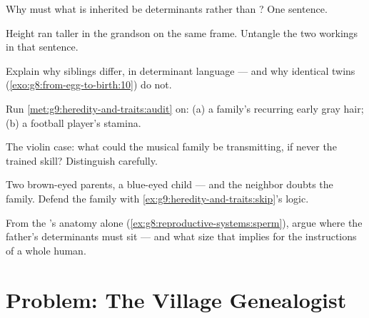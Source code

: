 \begin{exercise}[$\star$]\label{exo:g9:heredity-and-traits:6}
Why must what is inherited be determinants rather than
? One sentence.
\end{exercise}

\begin{exercise}[$\star\star$]\label{exo:g9:heredity-and-traits:7}
Height ran taller in the grandson on the same frame.
Untangle the two workings in that sentence.
\end{exercise}

\begin{exercise}[$\star\star$]\label{exo:g9:heredity-and-traits:8}
Explain why siblings differ, in determinant language ---
and why identical twins
(\cref{exo:g8:from-egg-to-birth:10}) do not.
\end{exercise}

\begin{exercise}[$\star\star$]\label{exo:g9:heredity-and-traits:9}
Run \cref{met:g9:heredity-and-traits:audit} on: (a) a
family's recurring early gray hair; (b) a football
player's stamina.
\end{exercise}

\begin{exercise}[$\star\star$]\label{exo:g9:heredity-and-traits:10}
The violin case: what could the musical family be
transmitting, if never the trained skill? Distinguish
carefully.
\end{exercise}

\begin{exercise}[$\star\star$]\label{exo:g9:heredity-and-traits:11}
Two brown-eyed parents, a blue-eyed child --- and the
neighbor doubts the family. Defend the family with
\cref{ex:g9:heredity-and-traits:skip}'s logic.
\end{exercise}

\begin{exercise}[$\star\star\star$]\label{exo:g9:heredity-and-traits:12}
From the 's anatomy alone
(\cref{ex:g8:reproductive-systems:sperm}), argue where
the father's determinants must sit --- and what size
that implies for the instructions of a whole human.
\end{exercise}

\section{Problem: The Village Genealogist}

